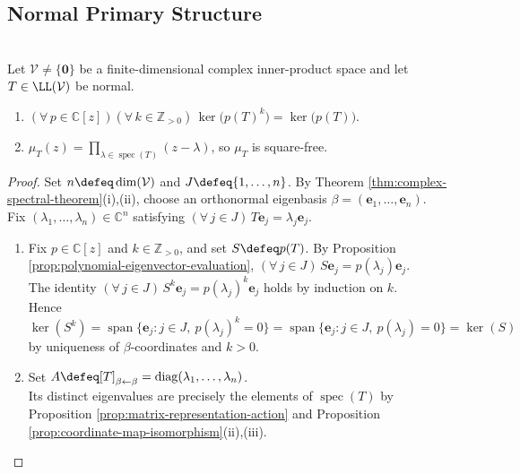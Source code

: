 \subsection{Normal Primary Structure}

\begin{corollary} \label{cor:normal-kernels-of-powers-and-squarefree-minimal-polynomial} \\
Let $\mathcal{V}\neq\{\mathbf{0}\}$ be a finite-dimensional complex inner-product space and let $T\in\LL(\mathcal{V})$ be normal.
\begin{enumerate}[label=(\roman*)]
\setlength{\itemsep}{0pt}
\item $(\forall\,p\in\mathbb{C}[z])(\forall\,k\in\mathbb{Z}_{>0})\,\ker\!\bigl(p(T)^k\bigr)=\ker\!\bigl(p(T)\bigr)$.
\item $\mu_T(z)=\prod\limits_{\lambda\in\operatorname{spec}(T)}(z-\lambda)$, so $\mu_T$ is square-free.
\end{enumerate}
\begin{proof}
Set $n\defeq\dim(\mathcal{V})$ and $J\defeq\{1,\ldots,n\}$. By Theorem \ref{thm:complex-spectral-theorem}(i),(ii), choose an orthonormal eigenbasis $\beta=(\mathbf{e}_1,\ldots,\mathbf{e}_n)$.\\
Fix $(\lambda_1,\ldots,\lambda_n)\in\mathbb{C}^n$ satisfying $(\forall\,j\in J)\,T\mathbf{e}_j=\lambda_j\mathbf{e}_j$.
\begin{enumerate}[label=(\roman*)]
\setlength{\itemsep}{0pt}
\item Fix $p\in\mathbb{C}[z]$ and $k\in\mathbb{Z}_{>0}$, and set $S\defeq p(T)$. By Proposition \ref{prop:polynomial-eigenvector-evaluation}, $(\forall\,j\in J)\,S\mathbf{e}_j=p(\lambda_j)\mathbf{e}_j$.\\
The identity $(\forall\,j\in J)\,S^k\mathbf{e}_j=p(\lambda_j)^k\mathbf{e}_j$ holds by induction on $k$.\\
Hence $\ker(S^k)=\operatorname{span}\{\mathbf{e}_j:j\in J,\ p(\lambda_j)^k=0\}=\operatorname{span}\{\mathbf{e}_j:j\in J,\ p(\lambda_j)=0\}=\ker(S)$ by uniqueness of $\beta$-coordinates and $k>0$.
\item Set $A\defeq[T]_{\beta\leftarrow\beta}=\operatorname{diag}(\lambda_1,\ldots,\lambda_n)$.\\
Its distinct eigenvalues are precisely the elements of $\operatorname{spec}(T)$ by Proposition \ref{prop:matrix-representation-action} and Proposition \ref{prop:coordinate-map-isomorphism}(ii),(iii).\\

\end{enumerate}
\end{proof}
\end{corollary}
